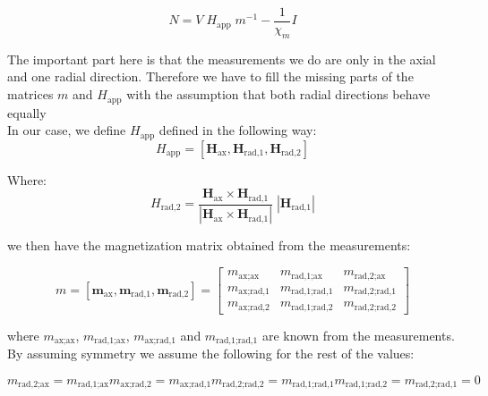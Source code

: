\begin{equation}
N = V\; H_\text{app}\; m^{-1} - \frac{1}{\chi_m}I
\end{equation}

The important part here is that the measurements we do are only in the axial and one radial direction. Therefore we have to fill the missing parts of the matrices $m$ and $H_\text{app}$ with the assumption that both radial directions behave equally\\

In our case, we define $H_\text{app}$ defined in the following way:
\begin{equation}
H_\text{app} = [\textbf{H}_\text{ax}, \textbf{H}_\text{rad,1}, \textbf{H}_\text{rad,2}]
\end{equation}

Where:
\begin{equation}
H_\text{rad,2} =\frac{ \textbf{H}_\text{ax} \times \textbf{H}_\text{rad,1} }{|\textbf{H}_\text{ax} \times \textbf{H}_\text{rad,1}|}\;|\textbf{H}_\text{rad,1}|
\end{equation}

we then have the magnetization matrix obtained from the measurements:

\begin{equation}
m = [\textbf{m}_\text{ax},\textbf{m}_\text{rad,1},\textbf{m}_\text{rad,2}] = \left[\begin{array}{ccc}
m_\text{ax;ax} & m_\text{rad,1;ax} & m_\text{rad,2;ax} \\
m_\text{ax;rad,1} & m_\text{rad,1;rad,1} & m_\text{rad,2;rad,1}\\
m_\text{ax;rad,2} & m_\text{rad,1;rad,2} & m_\text{rad,2;rad,2}
\end{array}\right]
\end{equation}

where $m_\text{ax;ax}$,   $m_\text{rad,1;ax}$, $m_\text{ax;rad,1}$ and $m_\text{rad,1;rad,1}$ are known from the measurements. By assuming symmetry we assume the following for the rest of the values:

\begin{subequations}
\begin{equation}
m_\text{rad,2;ax} = m_\text{rad,1;ax} 
\end{equation}
\begin{equation}
m_\text{ax;rad,2} = m_\text{ax;rad,1} 
\end{equation}
\begin{equation}
 m_\text{rad,2;rad,2} = m_\text{rad,1;rad,1}
\end{equation}
\begin{equation}
m_\text{rad,1;rad,2} = m_\text{rad,2;rad,1} = 0
\end{equation}
\end{subequations}

